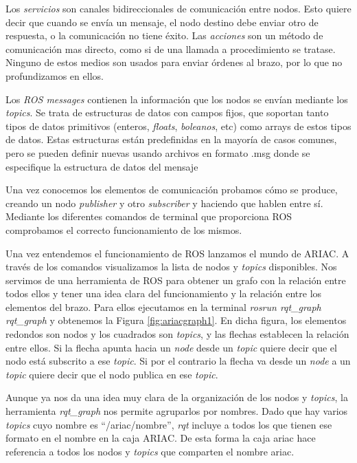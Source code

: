 Los \textit{servicios} son canales bidireccionales de comunicación entre nodos. Esto quiere decir que cuando se envía un mensaje, el nodo destino debe enviar otro de respuesta, o la comunicación no tiene éxito. Las \textit{acciones} son un método de comunicación mas directo, como si de una llamada a procedimiento se tratase. Ninguno de estos medios son usados para enviar órdenes al brazo, por lo que no profundizamos en ellos.

Los \textit{ROS messages} contienen la información que los nodos se envían mediante los \textit{topics}. Se trata de estructuras de datos con campos fijos, que soportan tanto tipos de datos primitivos (enteros, \textit{floats}, \textit{boleanos}, etc) como arrays de estos tipos de datos. Estas estructuras están predefinidas en la mayoría de casos comunes, pero se pueden definir nuevas usando archivos en formato .msg donde se especifique la estructura de datos del mensaje

Una vez conocemos los elementos de comunicación probamos cómo se produce, creando un nodo \textit{publisher} y otro \textit{subscriber} y haciendo que hablen entre sí. Mediante los diferentes comandos de terminal que proporciona ROS comprobamos el correcto funcionamiento de los mismos. 

Una vez entendemos el funcionamiento de ROS lanzamos el mundo de ARIAC. A través de los comandos visualizamos la lista de nodos y \textit{topics} disponibles. Nos servimos de una herramienta de ROS para obtener un grafo con la relación entre todos ellos y tener una idea clara del funcionamiento y la relación entre los elementos del brazo. Para ellos ejecutamos en la terminal \textit{rosrun rqt\_graph rqt\_graph} y obtenemos la Figura \ref{fig:ariacgraph1}. En dicha figura, los elementos redondos son nodos y los cuadrados son \textit{topics}, y las flechas establecen la relación entre ellos. Si la flecha apunta hacia un \textit{node} desde un \textit{topic} quiere decir que el nodo está subscrito a ese \textit{topic}. Si por el contrario la flecha va desde un \textit{node} a un \textit{topic} quiere decir que el nodo publica en ese \textit{topic}.

Aunque ya nos da una idea muy clara de la organización de los nodos y \textit{topics}, la herramienta \textit{rqt\_graph} nos permite agruparlos por nombres. Dado que hay varios \textit{topics} cuyo nombre es \textquotedblleft /ariac/nombre\textquotedblright , \textit{rqt} incluye a todos los que tienen ese formato en el nombre en la caja ARIAC. De esta forma la caja ariac hace referencia a todos los nodos y \textit{topics} que comparten el nombre ariac.

